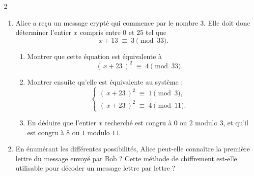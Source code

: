 \documentclass[a4paper,12pt]{article}
\begin{document}
\begin{multicols}{2}
\begin{exercice}[title=Exercice 29 $\star\star\star$ { [Modéliser, Calculer] }]{}{}
\begin{enumerate}
    \item Alice a reçu un message crypté qui commence par le nombre 3.
      Elle doit donc déterminer l'entier \(x\) compris entre \(0\) et \(25\) tel que
      \[
        x + 13 \;\equiv\; 3 \pmod{33}.
      \]
      \begin{enumerate}
        \item Montrer que cette équation est équivalente à
          \[
            (\,x + 23\,)^2 \;\equiv\; 4 \pmod{33}.
          \]
        \item Montrer ensuite qu'elle est équivalente au système :
          \[
            \begin{cases}
              (\,x+23\,)^2 \;\equiv\; 1 \pmod{3},\\
              (\,x+23\,)^2 \;\equiv\; 4 \pmod{11}.
            \end{cases}
          \]
        \item En déduire que l'entier \(x\) recherché est congru à \(0\) ou \(2\) modulo \(3\), et qu'il est congru à \(8\) ou \(1\) modulo \(11\).
      \end{enumerate}

    \item En énumérant les différentes possibilités, Alice peut-elle connaître la première lettre du message envoyé par Bob ?
      Cette méthode de chiffrement est-elle utilisable pour décoder un message lettre par lettre ?
  \end{enumerate}
\end{exercice}


\end{multicols}
\end{document}
